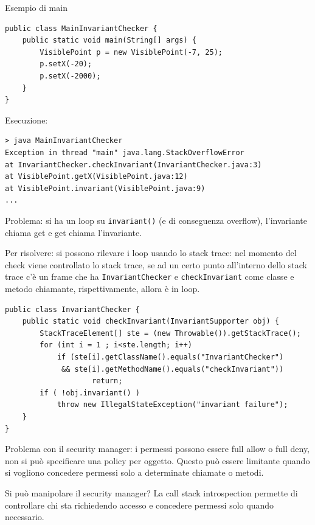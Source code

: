 Esempio di main
\begin{verbatim}
public class MainInvariantChecker {
    public static void main(String[] args) {
        VisiblePoint p = new VisiblePoint(-7, 25);
        p.setX(-20);
        p.setX(-2000);
    }
}
\end{verbatim}
Esecuzione:
\begin{verbatim}
> java MainInvariantChecker
Exception in thread "main" java.lang.StackOverflowError
at InvariantChecker.checkInvariant(InvariantChecker.java:3)
at VisiblePoint.getX(VisiblePoint.java:12)
at VisiblePoint.invariant(VisiblePoint.java:9)
...
\end{verbatim}

Problema: si ha un loop su \texttt{invariant()} (e di conseguenza overflow), l'invariante chiama get e get chiama l'invariante.

Per risolvere: si possono rilevare i loop usando lo stack trace: nel momento del check viene controllato lo stack trace, se ad un certo punto all'interno dello stack trace c'è un frame che ha \texttt{InvariantChecker} e \texttt{checkInvariant} come classe e metodo chiamante, rispettivamente, allora è in loop.
\begin{verbatim}
public class InvariantChecker {
    public static void checkInvariant(InvariantSupporter obj) {
        StackTraceElement[] ste = (new Throwable()).getStackTrace();
        for (int i = 1 ; i<ste.length; i++)
            if (ste[i].getClassName().equals("InvariantChecker")
             && ste[i].getMethodName().equals("checkInvariant"))
                    return;
        if ( !obj.invariant() )
            throw new IllegalStateException("invariant failure");
    }
}
\end{verbatim}


Problema con il security manager: i permessi possono essere full allow o full deny, non si può specificare una policy per oggetto. Questo può essere limitante quando si vogliono concedere permessi solo a determinate chiamate o metodi.

Si può manipolare il security manager? La call stack introspection permette di controllare chi sta richiedendo accesso e concedere permessi solo quando necessario.

